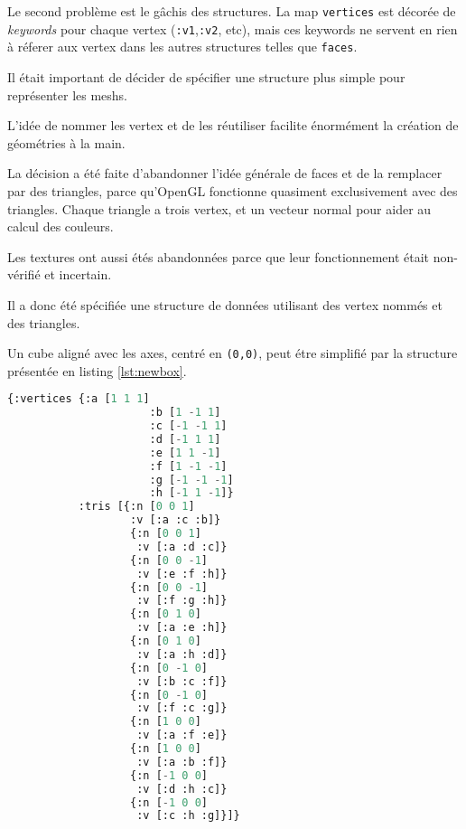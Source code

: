 \documentclass{report}
\begin{document}
Le second problème est le \og gâchis\fg{} des structures. La map
\lstinline|vertices| est décorée de \emph{keywords} pour chaque vertex
(\lstinline|:v1|,\lstinline|:v2|, etc),
mais ces keywords ne servent en rien à réferer aux vertex dans les autres
structures telles que \lstinline|faces|.

Il était important de décider de spécifier une structure plus simple pour
représenter les meshs.

L'idée de nommer les vertex et de les réutiliser facilite énormément la création
de géométries à la main.

La décision a été faite d'abandonner l'idée générale de \og faces\fg{} et de la
remplacer par des triangles, parce qu'OpenGL fonctionne quasiment exclusivement
avec des triangles.
Chaque triangle a trois vertex, et un vecteur normal pour aider au calcul des
couleurs.

Les textures ont aussi étés abandonnées parce que leur fonctionnement était
non-vérifié et incertain.

Il a donc été spécifiée une structure de données utilisant des vertex nommés et
des triangles.

Un cube aligné avec les axes, centré en \texttt{(0,0)}, peut étre simplifié par
la structure présentée en listing \ref{lst:newbox}.

\begin{lstlisting}[caption=Géométrie d'un cube,label={lst:newbox},language=Lisp]
          {:vertices {:a [1 1 1]
                      :b [1 -1 1]
                      :c [-1 -1 1]
                      :d [-1 1 1]
                      :e [1 1 -1]
                      :f [1 -1 -1]
                      :g [-1 -1 -1]
                      :h [-1 1 -1]}
           :tris [{:n [0 0 1]
                   :v [:a :c :b]}
                   {:n [0 0 1]
                    :v [:a :d :c]}
                   {:n [0 0 -1]
                    :v [:e :f :h]}
                   {:n [0 0 -1]
                    :v [:f :g :h]}
                   {:n [0 1 0]
                    :v [:a :e :h]}
                   {:n [0 1 0]
                    :v [:a :h :d]}
                   {:n [0 -1 0]
                    :v [:b :c :f]}
                   {:n [0 -1 0]
                    :v [:f :c :g]}
                   {:n [1 0 0]
                    :v [:a :f :e]}
                   {:n [1 0 0]
                    :v [:a :b :f]}
                   {:n [-1 0 0]
                    :v [:d :h :c]}
                   {:n [-1 0 0]
                    :v [:c :h :g]}]}
\end{lstlisting}
\end{document}

